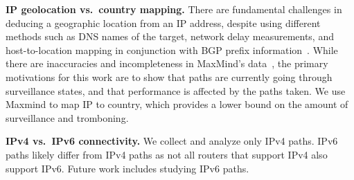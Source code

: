 \textbf{IP geolocation vs.\ country mapping.}
There are fundamental challenges in deducing a geographic location
from an IP address, 
despite using different methods such as DNS names of the target,
network delay measurements, and host-to-location mapping in
conjunction with BGP prefix
information~\cite{padmanabhan2001investigation}.  While there are
inaccuracies and incompleteness in MaxMind's
data~\cite{huffaker2011geocompare}, the primary motivations for this work are to show that paths 
are currently going through surveillance states, and that performance is affected by the 
paths taken.  We use Maxmind to map IP to
country,
which provides a lower
bound on the amount of surveillance and tromboning.

\textbf{IPv4 vs.\ IPv6 connectivity.}
We collect and analyze only IPv4 paths.  IPv6 paths likely
differ from IPv4 paths as not all routers that support IPv4 also support
IPv6.  Future work includes studying IPv6 paths.  

